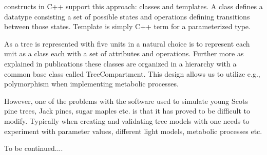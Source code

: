constructs  in C++  support this  approach: classes  and  templates. A
class  defines a  datatype consisting  a  set of  possible states  and
operations  defining  transitions between  those  states. Template  is
simply C++ term for a parameterized type.

As a tree  is represented with five units  in \lignum a natural choice
is to represent each unit as a class each with a set of attributes and
operations. Further more as explained   in publications these  classes
are  organized   in a  hierarchy  with  a  common  base   class called
TreeCompartment.  This design allows us  to utilize e.g., polymorphism
when implementing metabolic processes.  

However, one of the problems with the  software used to simulate young
Scots pine trees, Jack pines, sugar maples etc. is  that it has proved
to   be difficult to modify.  Typically   when creating and validating
tree  models   with \lignum  one  needs to   experiment with parameter
values, different light models, metabolic processes etc.

To be continued....

